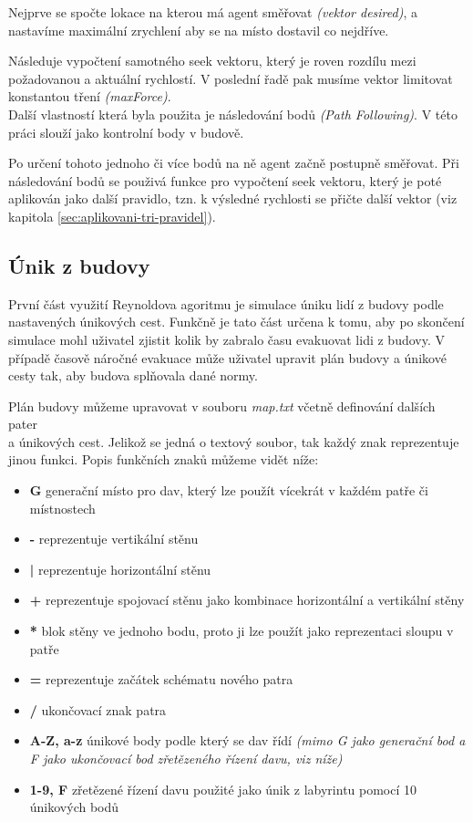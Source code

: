 \documentclass[czech,public,dept460,male,cpdeclaration]{diploma}
\begin{document}
Nejprve se spočte lokace na kterou má agent směřovat \textit{(vektor desired)}, a nastavíme maximální zrychlení aby se na místo dostavil co nejdříve.

Následuje vypočtení samotného seek vektoru, který je roven rozdílu mezi požadovanou a aktuální rychlostí. V poslední řadě pak musíme vektor limitovat konstantou tření \textit{(maxForce)}.
\\

Další vlastností která byla použita je následování bodů \textit{(Path Following)}. V této práci slouží jako kontrolní body v budově.

Po určení tohoto jednoho či více bodů na ně agent začně postupně směřovat. Při následování bodů se použivá funkce pro vypočtení seek vektoru, který je poté aplikován jako další pravidlo, tzn. k výsledné rychlosti se přičte další vektor (viz kapitola \ref{sec:aplikovani-tri-pravidel}).

\subsection{Únik z budovy}
První část využití Reynoldova agoritmu je simulace úniku lidí z budovy podle nastavených únikových cest. Funkčně je tato část určena k tomu, aby po skončení simulace mohl uživatel zjistit kolik by zabralo času evakuovat lidi z budovy. V případě časově náročné evakuace může uživatel upravit plán budovy a únikové cesty tak, aby budova splňovala dané normy.

Plán budovy můžeme upravovat v souboru \textit{map.txt} včetně definování dalších pater\\ a únikových cest. Jelikož se jedná o textový soubor, tak každý znak reprezentuje jinou funkci. Popis funkčních znaků můžeme vidět níže:

\begin{itemize}
	\item \textbf{G} generační místo pro dav, který lze použít vícekrát v každém patře či místnostech
	\item \textbf{-} reprezentuje vertikální stěnu
	\item \textbf{|} reprezentuje horizontální stěnu
	\item \textbf{+} reprezentuje spojovací stěnu jako kombinace horizontální a vertikální stěny
	\item \textbf{*} blok stěny ve jednoho bodu, proto ji lze použít jako reprezentaci sloupu v patře
	\item \textbf{=} reprezentuje začátek schématu nového patra
	\item \textbf{/} ukončovací znak patra
	\item \textbf{A-Z, a-z} únikové body podle který se dav řídí \textit{(mimo G jako generační bod a F jako ukončovací bod zřetězeného řízení davu, viz níže)}
	\item \textbf{1-9, F} zřetězené řízení davu použité jako únik z labyrintu pomocí 10 únikových bodů
\end{itemize}
\end{document}
